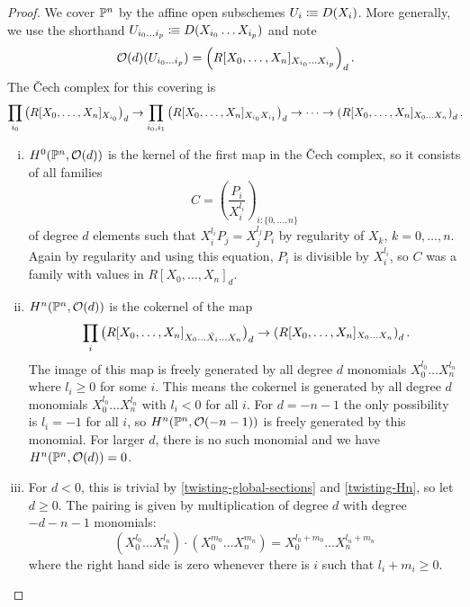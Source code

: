 \begin{proof}
  We cover $\mathbb{P}^n$ by the affine open subschemes $U_i\vcentcolon\mspace{-1.2mu}\equiv D(X_i)$.
  More generally, we use the shorthand $U_{i_0\dots i_p}\vcentcolon\mspace{-1.2mu}\equiv D(X_{i_0}\dots X_{i_p})$
  and note
  \[
    \mathcal O(d)(U_{i_0\dots i_p})=\left(R[X_0,\dots,X_n]_{X_{i_0}\dots X_{i_p}}\right)_d
    \rlap{.}
  \]
  The \v{C}ech complex for this covering is
  \[
    \prod_{i_0}\left(R[X_0,\dots,X_n]_{X_{i_0}}\right)_d \to \prod_{i_0,i_1} \left(R[X_0,\dots,X_n]_{X_{i_0} X_{i_1}}\right)_d \to \dots \to \left(R[X_0,\dots,X_n]_{X_0\dots X_n}\right)_d
    \rlap{.}
  \]
  \begin{enumerate}[(i)]
  \item\label{twisting-global-sections} $H^0(\mathbb{P}^n,\mathcal O(d))$ is the kernel of the first map in the \v{C}ech complex,
    so it consists of all families
    \[
      C=\left(\frac{P_i}{X_{i}^{l_i}}\right)_{i:\{0,\dots,n\}}
    \]
    of degree $d$ elements such that $X_i^{l_i}P_j=X_j^{l_j}P_i$ by regularity of $X_k$, $k=0,\dots,n$.
    Again by regularity and using this equation, $P_i$ is divisible by $X_i^{l_i}$, so $C$ was a family with values in $R[X_0,\dots,X_n]_d$.
  \item\label{twisting-Hn} $H^n(\mathbb{P}^n,\mathcal O(d))$ is the cokernel of the map
    \[
      \prod_{i} \left(R[X_0,\dots,X_n]_{X_0\dots \hat{X_i}\dots X_n}\right)_d \to \left(R[X_0,\dots,X_n]_{X_0\dots X_n}\right)_d
      \rlap{.}
    \]
    The image of this map is freely generated by all degree $d$ monomials $X_0^{l_0}\dots X_n^{l_n}$ where $l_i\geq 0$ for some $i$.
    This means the cokernel is generated by all degree $d$ monomials $X_0^{l_0}\dots X_n^{l_n}$ with $l_i<0$ for all $i$.
    For $d= -n-1$ the only possibility is $l_i=-1$ for all $i$, so $H^n(\mathbb{P}^n,\mathcal O(-n-1))$ is freely generated by this monomial.
    For larger $d$, there is no such monomial and we have $H^n(\mathbb{P}^n,\mathcal O(d))=0$.
  \item For $d<0$, this is trivial by \ref{twisting-global-sections} and \ref{twisting-Hn}, so let $d\geq 0$.
    The pairing is given by multiplication of degree $d$ with degree $-d-n-1$ monomials:
    \[
      (X_0^{l_0}\dots X_n^{l_n}) \cdot (X_0^{m_0}\dots X_n^{m_n})=X_0^{l_0+m_0}\dots X_n^{l_n+m_n}
    \]
    where the right hand side is zero whenever there is $i$ such that $l_i+m_i\geq 0$.
    

\end{enumerate}
\end{proof}
